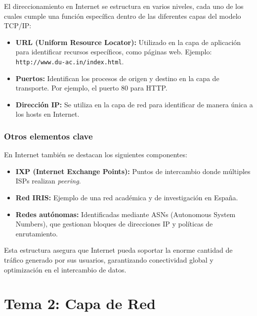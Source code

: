 \documentclass[a4paper,12pt]{article}
\begin{document}
El direccionamiento en Internet se estructura en varios niveles, cada uno de los cuales cumple una función específica dentro de las diferentes capas del modelo TCP/IP:
\begin{itemize}
    \item \textbf{URL (Uniform Resource Locator):} Utilizado en la capa de aplicación para identificar recursos específicos, como páginas web. Ejemplo: \texttt{http://www.du-ac.in/index.html}.
    \item \textbf{Puertos:} Identifican los procesos de origen y destino en la capa de transporte. Por ejemplo, el puerto 80 para HTTP.
    \item \textbf{Dirección IP:} Se utiliza en la capa de red para identificar de manera única a los hosts en Internet.
\end{itemize}


\subsubsection{Otros elementos clave}

En Internet también se destacan los siguientes componentes:
\begin{itemize}
    \item \textbf{IXP (Internet Exchange Points):} Puntos de intercambio donde múltiples ISPs realizan \textit{peering}.
    \item \textbf{Red IRIS:} Ejemplo de una red académica y de investigación en España.
    \item \textbf{Redes autónomas:} Identificadas mediante ASNs (Autonomous System Numbers), que gestionan bloques de direcciones IP y políticas de enrutamiento.
\end{itemize}

Esta estructura asegura que Internet pueda soportar la enorme cantidad de tráfico generado por sus usuarios, garantizando conectividad global y optimización en el intercambio de datos.



\section{Tema 2: Capa de Red}
\end{document}
